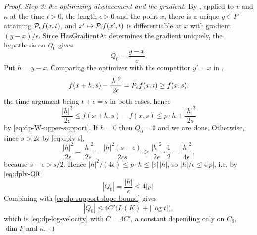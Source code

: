 \begin{proof}
\emph{Step 3: the optimizing displacement and the gradient.}
By , applied to $v$ and $\kappa$ at the time $t>0$,
the length $\epsilon>0$ and the point $x$, there is a unique
$y\in F$ attaining $\mathcal{P}_\epsilon f(x,t)$, and $x'\mapsto\mathcal{P}_\epsilon f(x',t)$
is differentiable at $x$ with gradient $(y-x)/\epsilon$. Since
$\mathrm{HasGradientAt}$ determines the gradient uniquely, the hypothesis on
$Q_0$ gives
\begin{equation}\label{eq:dplv-Q0}
  Q_0=\frac{y-x}{\epsilon}.
\end{equation}
Put $h=y-x$. Comparing the optimizer with the competitor $y'=x$ in
,
\[
  f(x+h,s)-\frac{|h|^2}{2\epsilon}=\mathcal{P}_\epsilon f(x,t)\ge f(x,s),
\]
the time argument being $t+\epsilon=s$ in both cases, hence
\[
  \frac{|h|^2}{2\epsilon}\le f(x+h,s)-f(x,s)\le p\cdot h+\frac{|h|^2}{2s}
\]
by \eqref{eq:dp-W-upper-support}. If $h=0$ then $Q_0=0$ and we are done.
Otherwise, since $s>2\epsilon$ by \eqref{eq:dplv-s},
\[
  \frac{|h|^2}{2\epsilon}-\frac{|h|^2}{2s}
   =\frac{|h|^2(s-\epsilon)}{2\epsilon s}
   \ge\frac{|h|^2}{2\epsilon}\cdot\frac12=\frac{|h|^2}{4\epsilon},
\]
because $s-\epsilon>s/2$. Hence
$|h|^2/(4\epsilon)\le p\cdot h\le|p|\,|h|$, so $|h|/\epsilon\le4|p|$, i.e. by
\eqref{eq:dplv-Q0}
\[
  |Q_0|=\frac{|h|}{\epsilon}\le4|p| .
\]
Combining with \eqref{eq:dp-support-slope-bound} gives
\[
  |Q_0|\le4C'\bigl(L(K)+|\log t|\bigr),
\]
which is \eqref{eq:dp-log-velocity} with $C=4C'$, a constant depending only on
$C_0$, $\dim F$ and $\kappa$.
\end{proof}
